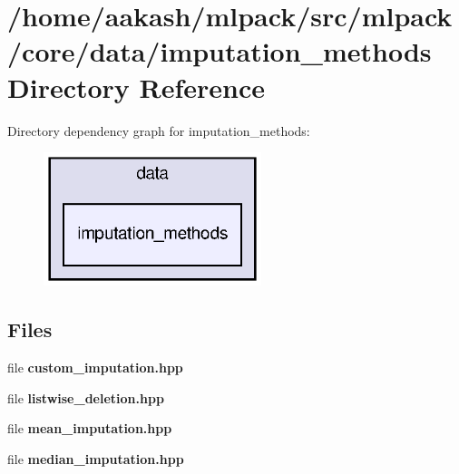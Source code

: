 \section{/home/aakash/mlpack/src/mlpack/core/data/imputation\+\_\+methods Directory Reference}
\label{dir_199a51b2d898abcb68f0ab4545dd316d}
Directory dependency graph for imputation\+\_\+methods\+:
\nopagebreak
\begin{figure}[H]
\begin{center}
\leavevmode
\includegraphics[width=180pt]{dir_199a51b2d898abcb68f0ab4545dd316d_dep}
\end{center}
\end{figure}
\subsection*{Files}
\begin{DoxyCompactItemize}
\item 
file \textbf{ custom\+\_\+imputation.\+hpp}
\item 
file \textbf{ listwise\+\_\+deletion.\+hpp}
\item 
file \textbf{ mean\+\_\+imputation.\+hpp}
\item 
file \textbf{ median\+\_\+imputation.\+hpp}
\end{DoxyCompactItemize}
